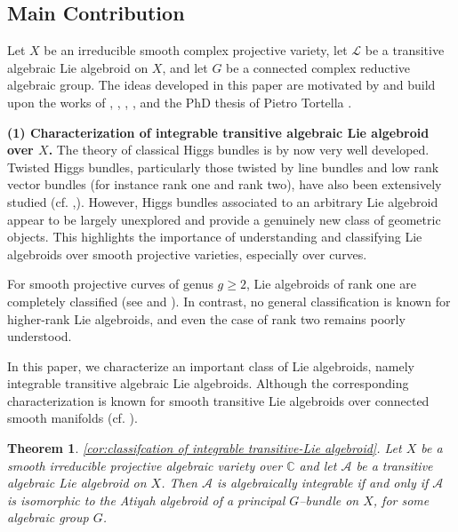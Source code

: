 \documentclass[12pt,reqno]{amsart}
\numberwithin{equation}{subsection}
\newtheorem{thm}[equation]{Theorem}
\theoremstyle{definition}
\theoremstyle{theorem}
\begin{document}


\subsection{Main Contribution}

Let \(X\) be an irreducible smooth complex projective variety, let \(\mathcal{L}\) be a transitive algebraic Lie algebroid on \(X\), and let \(G\) be a connected complex reductive algebraic group. The ideas developed in this paper are motivated by and build upon the works of \cite{Alfaya-Oliveire-2024}, \cite{CT.Simpson-1994}, \cite{CT.Simpson-1995}, \cite{Beilinson-Bernstein-1993}, and the PhD thesis of Pietro Tortella \cite{P.Tortella-2011T}.

\medskip

\noindent
\textbf{(1) Characterization of integrable transitive algebraic Lie algebroid over $X$.} The theory of classical Higgs bundles is by now very well developed. Twisted Higgs bundles, particularly those twisted by line bundles and low rank vector bundles (for instance rank one and rank two), have also been extensively studied (cf. \cite{N.Nitsure-1991},\cite{Gallego-Oscar-Narasimhan-2024}). However, Higgs bundles associated to an arbitrary Lie algebroid appear to be largely unexplored and provide a genuinely new class of geometric objects. This highlights the importance of understanding and classifying Lie algebroids over smooth projective varieties, especially over curves.

For smooth projective curves of genus \(g \geqslant 2\), Lie algebroids of rank one are completely classified (see \cite[Proposition 2.1]{GLP-2018} and \cite[Theorem 1.2]{Alfaya-Oliveire-2024}). In contrast, no general classification is known for higher-rank Lie algebroids, and even the case of rank two remains poorly understood. 

In this paper, we characterize an important class of Lie algebroids, namely integrable transitive algebraic Lie algebroids. Although the corresponding characterization is known for smooth transitive Lie algebroids over connected smooth manifolds (cf. \cite{Moerdijk-2003}).


\begin{thm}\eqref{cor:classifcation of integrable transitive-Lie algebroid}.
Let $X$ be a smooth irreducible projective algebraic variety over $\mathbb{C}$ and let $\mathcal{A}$ be a transitive algebraic Lie algebroid on $X$. Then $\mathcal{A}$ is algebraically integrable if and only if $\mathcal{A}$ is isomorphic to the Atiyah algebroid of a principal
$G$--bundle on $X$, for some algebraic group $G$.
\end{thm}
\end{document}
